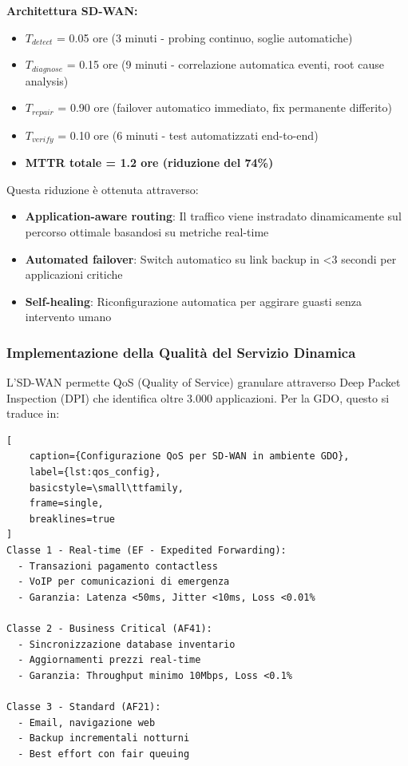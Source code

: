\textbf{Architettura SD-WAN:}
\begin{itemize}
    \item $T_{detect}$ = 0.05 ore (3 minuti - probing continuo, soglie automatiche)
    \item $T_{diagnose}$ = 0.15 ore (9 minuti - correlazione automatica eventi, root cause analysis)
    \item $T_{repair}$ = 0.90 ore (failover automatico immediato, fix permanente differito)
    \item $T_{verify}$ = 0.10 ore (6 minuti - test automatizzati end-to-end)
    \item \textbf{MTTR totale = 1.2 ore (riduzione del 74\%)}
\end{itemize}

Questa riduzione è ottenuta attraverso:
\begin{itemize}
    \item \textbf{Application-aware routing}: Il traffico viene instradato dinamicamente sul percorso ottimale basandosi su metriche real-time
    \item \textbf{Automated failover}: Switch automatico su link backup in <3 secondi per applicazioni critiche
    \item \textbf{Self-healing}: Riconfigurazione automatica per aggirare guasti senza intervento umano
\end{itemize}

\subsubsection{Implementazione della Qualità del Servizio Dinamica}

L'SD-WAN permette QoS (Quality of Service) granulare attraverso Deep Packet Inspection (DPI) che identifica oltre 3.000 applicazioni. Per la GDO, questo si traduce in:

\begin{lstlisting}[
    caption={Configurazione QoS per SD-WAN in ambiente GDO},
    label={lst:qos_config},
    basicstyle=\small\ttfamily,
    frame=single,
    breaklines=true
]
Classe 1 - Real-time (EF - Expedited Forwarding):
  - Transazioni pagamento contactless
  - VoIP per comunicazioni di emergenza
  - Garanzia: Latenza <50ms, Jitter <10ms, Loss <0.01%

Classe 2 - Business Critical (AF41):
  - Sincronizzazione database inventario
  - Aggiornamenti prezzi real-time
  - Garanzia: Throughput minimo 10Mbps, Loss <0.1%

Classe 3 - Standard (AF21):
  - Email, navigazione web
  - Backup incrementali notturni
  - Best effort con fair queuing
\end{lstlisting}


